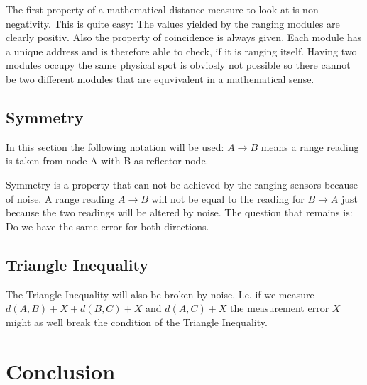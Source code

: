 The first property of a mathematical distance measure to look at is non-negativity. This is quite easy: The values yielded by the ranging modules are clearly positiv.
Also the property of coincidence is always given.
Each module has a unique address and is therefore able to check, if it is ranging itself.
Having two modules occupy the same physical spot is obviosly not possible so there cannot be two different modules that are equvivalent in a mathematical sense.

\subsection{Symmetry}

In this section the following notation will be used: $A \rightarrow B$ means a range reading is taken from node A with B as reflector node.

Symmetry is a property that can not be achieved by the ranging sensors because of noise. 
A range reading $A \rightarrow B$ will not be equal to the reading for $B \rightarrow A$ just because the two readings will be altered by noise.
The question that remains is: Do we have the same error for both directions.



\subsection{Triangle Inequality}
The Triangle Inequality will also be broken by noise.
I.e. if we measure $d(A,B) + X + d(B,C) + X$ and $d(A, C) + X$ the measurement error $X$ might as well break the condition of the Triangle Inequality.


\section{Conclusion}

